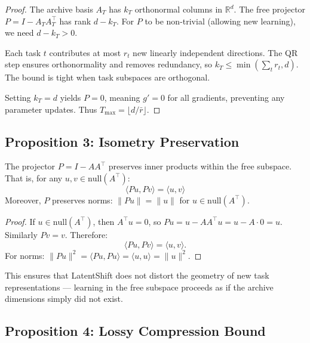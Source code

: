 \begin{proof}
The archive basis $A_T$ has $k_T$ orthonormal columns in $\mathbb{R}^d$.
The free projector $P = I - A_T A_T^\top$ has rank $d - k_T$. For $P$
to be non-trivial (allowing new learning), we need $d - k_T > 0$.

Each task $t$ contributes at most $r_t$ new linearly independent directions.
The QR step ensures orthonormality and removes redundancy, so
$k_T \leq \min(\sum_t r_t, d)$. The bound is tight when task subspaces
are orthogonal.

Setting $k_T = d$ yields $P = 0$, meaning $g' = 0$ for all gradients,
preventing any parameter updates. Thus $T_{\max} = \lfloor d/\bar{r} \rfloor$.
\end{proof}

\subsection{Proposition 3: Isometry Preservation}

\begin{proposition}
\label{prop:isometry}
The projector $P = I - AA^\top$ preserves inner products within the free
subspace. That is, for any $u, v \in \mathrm{null}(A^\top)$:
\begin{equation}
    \langle Pu, Pv \rangle = \langle u, v \rangle
\end{equation}
Moreover, $P$ preserves norms: $\|Pu\| = \|u\|$ for $u \in \mathrm{null}(A^\top)$.
\end{proposition}

\begin{proof}
If $u \in \mathrm{null}(A^\top)$, then $A^\top u = 0$, so
$Pu = u - AA^\top u = u - A \cdot 0 = u$. Similarly $Pv = v$. Therefore:
\[
    \langle Pu, Pv \rangle = \langle u, v \rangle.
\]
For norms: $\|Pu\|^2 = \langle Pu, Pu \rangle = \langle u, u \rangle = \|u\|^2$.
\end{proof}

This ensures that LatentShift does not distort the geometry of new task
representations — learning in the free subspace proceeds as if the
archive dimensions simply did not exist.

\subsection{Proposition 4: Lossy Compression Bound}

